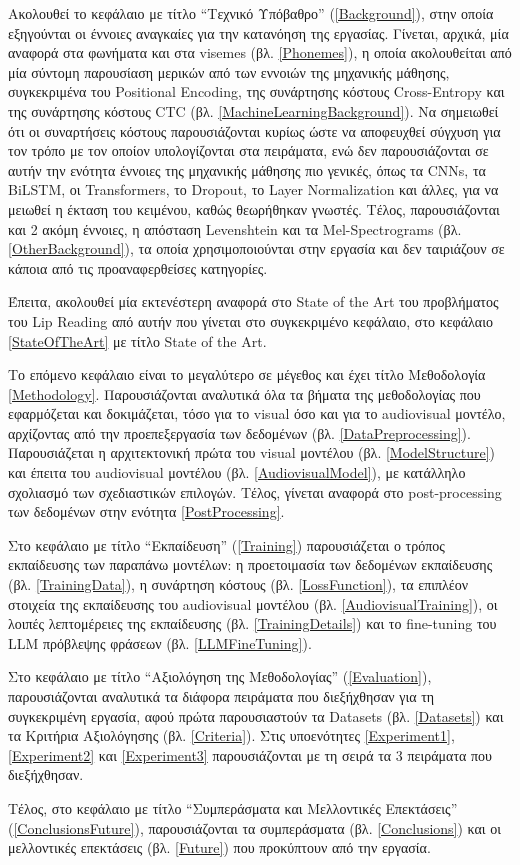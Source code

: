 Ακολουθεί το κεφάλαιο με τίτλο ``Τεχνικό Υπόβαθρο'' (\ref{Background}), στην οποία εξηγούνται οι έννοιες αναγκαίες για την κατανόηση της εργασίας. Γίνεται, αρχικά, μία αναφορά στα φωνήματα και στα visemes (βλ. \ref{Phonemes}), η οποία ακολουθείται από μία σύντομη παρουσίαση μερικών από των εννοιών της μηχανικής μάθησης, συγκεκριμένα του Positional Encoding, της συνάρτησης κόστους Cross-Entropy και της συνάρτησης κόστους CTC (βλ. \ref{MachineLearningBackground}). Να σημειωθεί ότι οι συναρτήσεις κόστους παρουσιάζονται κυρίως ώστε να αποφευχθεί σύγχυση για τον τρόπο με τον οποίον υπολογίζονται στα πειράματα, ενώ δεν παρουσιάζονται σε αυτήν την ενότητα έννοιες της μηχανικής μάθησης πιο γενικές, όπως τα CNNs, τα BiLSTM, οι Transformers, το Dropout, το Layer Normalization και άλλες, για να μειωθεί η έκταση του κειμένου, καθώς θεωρήθηκαν γνωστές. Τέλος, παρουσιάζονται και 2 ακόμη έννοιες, η απόσταση Levenshtein και τα Mel-Spectrograms (βλ. \ref{OtherBackground}), τα οποία χρησιμοποιούνται στην εργασία και δεν ταιριάζουν σε κάποια από τις προαναφερθείσες κατηγορίες.

Έπειτα, ακολουθεί μία εκτενέστερη αναφορά στο State of the Art του προβλήματος του Lip Reading από αυτήν που γίνεται στο συγκεκριμένο κεφάλαιο, στο κεφάλαιο \ref{StateOfTheArt} με τίτλο State of the Art.

Το επόμενο κεφάλαιο είναι το μεγαλύτερο σε μέγεθος και έχει τίτλο Μεθοδολογία \ref{Methodology}. Παρουσιάζονται αναλυτικά όλα τα βήματα της μεθοδολογίας που εφαρμόζεται και δοκιμάζεται, τόσο για το visual όσο και για το audiovisual μοντέλο, αρχίζοντας από την προεπεξεργασία των δεδομένων (βλ. \ref{DataPreprocessing}). Παρουσιάζεται η αρχιτεκτονική πρώτα του visual μοντέλου (βλ. \ref{ModelStructure}) και έπειτα του audiovisual μοντέλου (βλ. \ref{AudiovisualModel}), με κατάλληλο σχολιασμό των σχεδιαστικών επιλογών. Τέλος, γίνεται αναφορά στο post-processing των δεδομένων στην ενότητα \ref{PostProcessing}.

Στο κεφάλαιο με τίτλο ``Εκπαίδευση'' (\ref{Training}) παρουσιάζεται ο τρόπος εκπαίδευσης των παραπάνω μοντέλων: η προετοιμασία των δεδομένων εκπαίδευσης (βλ. \ref{TrainingData}), η συνάρτηση κόστους (βλ. \ref{LossFunction}), τα επιπλέον στοιχεία της εκπαίδευσης του audiovisual μοντέλου (βλ. \ref{AudiovisualTraining}), οι λοιπές λεπτομέρειες της εκπαίδευσης (βλ. \ref{TrainingDetails}) και το fine-tuning του LLM πρόβλεψης φράσεων (βλ. \ref{LLMFineTuning}).

Στο κεφάλαιο με τίτλο ``Αξιολόγηση της Μεθοδολογίας'' (\ref{Evaluation}), παρουσιάζονται αναλυτικά τα διάφορα πειράματα που διεξήχθησαν για τη συγκεκριμένη εργασία, αφού πρώτα παρουσιαστούν τα Datasets (βλ. \ref{Datasets}) και τα Κριτήρια Αξιολόγησης (βλ. \ref{Criteria}). Στις υποενότητες \ref{Experiment1}, \ref{Experiment2} και \ref{Experiment3} παρουσιάζονται με τη σειρά τα 3 πειράματα που διεξήχθησαν.

Τέλος, στο κεφάλαιο με τίτλο ``Συμπεράσματα και Μελλοντικές Επεκτάσεις'' (\ref{ConclusionsFuture}), παρουσιάζονται τα συμπεράσματα (βλ. \ref{Conclusions}) και οι μελλοντικές επεκτάσεις (βλ. \ref{Future}) που προκύπτουν από την εργασία.
